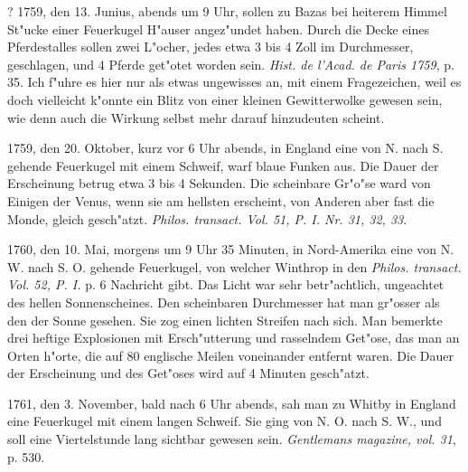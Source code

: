 \documentclass[a4paper, 11pt, oneside, polutonikogreek, german]{article}
\begin{document}
? 1759, den 13. Junius, abends um 9 Uhr, sollen zu Bazas bei heiterem Himmel St"ucke einer Feuerkugel H"auser angez"undet haben. Durch die Decke eines Pferdestalles sollen zwei L"ocher, jedes etwa 3 bis 4 Zoll im Durchmesser, geschlagen, und 4 Pferde get"otet worden sein. \emph{Hist. de l'Acad. de Paris 1759}, p. 35. Ich f"uhre es hier nur als etwas ungewisses an, mit einem Fragezeichen, weil es doch vielleicht k"onnte ein Blitz von einer kleinen Gewitterwolke gewesen sein, wie denn auch die Wirkung selbst mehr darauf hinzudeuten scheint.

1759, den 20. Oktober, kurz vor 6 Uhr abends, in England eine von N. nach S. gehende Feuerkugel mit einem Schweif, warf blaue Funken aus. Die Dauer der Erscheinung betrug etwa 3 bis 4 Sekunden. Die scheinbare Gr"o"se ward von Einigen der Venus, wenn sie am hellsten erscheint, von Anderen aber fast die Monde, gleich gesch"atzt. \emph{Philos. transact. Vol. 51, P. I. Nr. 31, 32, 33}.

1760, den 10. Mai, morgens um 9 Uhr 35 Minuten, in Nord-Amerika eine von N. W. nach S. O. gehende Feuerkugel, von welcher Winthrop in den \emph{Philos. transact. Vol. 52, P. I.} p. 6 Nachricht gibt. Das Licht war sehr betr"achtlich, ungeachtet des hellen Sonnenscheines. Den scheinbaren Durchmesser hat man gr"osser als den der Sonne gesehen. Sie zog einen lichten Streifen nach sich. Man bemerkte drei heftige Explosionen mit Ersch"utterung und rasselndem Get"ose, das man an Orten h"orte, die auf 80 englische Meilen voneinander entfernt waren. Die Dauer der Erscheinung und des Get"oses wird auf 4 Minuten gesch"atzt.

1761, den 3. November, bald nach 6 Uhr abends, sah man zu Whitby in England eine Feuerkugel mit einem langen Schweif. Sie ging von N. O. nach S. W., und soll eine Viertelstunde lang sichtbar gewesen sein. \emph{Gentlemans magazine, vol. 31}, p. 530.
\end{document}
